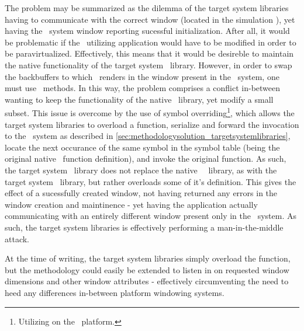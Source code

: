 The problem may be summarized as the dilemma of the target system libraries having to communicate with the correct window (located in the simulation \dvttermhost ), yet having the \dvttermtarget\ system window reporting sucessful initialization.
After all, it would be problematic if the \dvttermopengl\ utilizing application would have to be modified in order to be paravirtualized.
Effectively, this means that it would be desireble to maintain the native functionality of the target system \dvttermegl\ library.
However, in order to swap the backbuffers to which \dvttermopengl\ renders in the window present in the \dvttermhost\ system, one must use \dvttermegl\ methods.
In this way, the problem comprises a conflict in-between wanting to keep the functionality of the native \dvttermegl\ library, yet modify a small subset. 
This issue is overcome by the use of symbol overriding\footnote{Utilizing  on the \dvttermlinux\ platform.}, which allows the target system libraries to overload a function, serialize and forward the invocation to the \dvttermhost\ system as described in \ref{sec:methodologysolution_targetsystemlibraries}, locate the next occurance of the same symbol in the symbol table (being the original native \dvttermegl\ function definition), and invoke the original function.
As such, the target system \dvttermegl\ library does not replace the native \dvttermtarget\ \dvttermegl\ library, as with the target system \dvttermopengl\ library, but rather overloads some of it's definition.
This gives the effect of a sucessfully created window, not having returned any errors in the window creation and maintinence - yet having the application actually communicating with an entirely different window present only in the \dvttermhost\ system.
As such, the target system libraries is effectively performing a man-in-the-middle attack.

At the time of writing, the target system libraries simply overload the  function, but the methodology could easily be extended to listen in on requested window dimensions and other window attributes - effectively circumventing the need to heed any differences in-between platform windowing systems.

